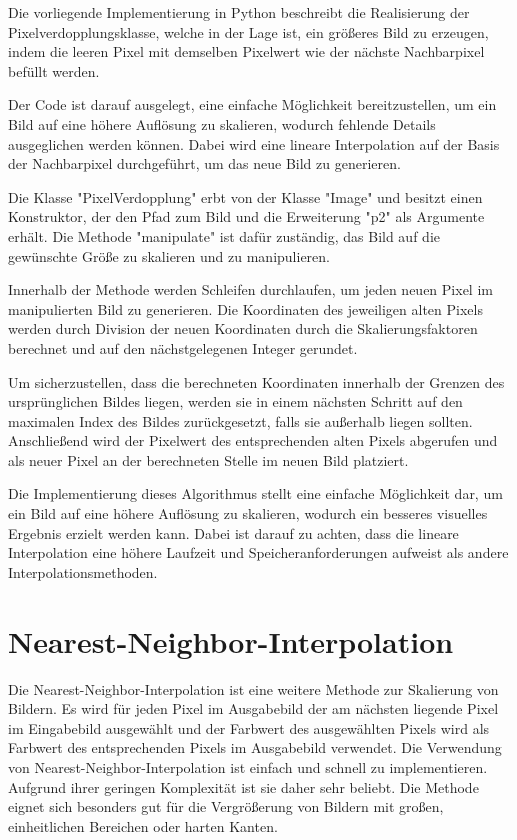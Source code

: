 Die vorliegende Implementierung in Python beschreibt die Realisierung der Pixelverdopplungsklasse, welche in der Lage ist, ein größeres Bild zu erzeugen, indem die leeren Pixel mit demselben Pixelwert wie der nächste Nachbarpixel befüllt werden.

Der Code ist darauf ausgelegt, eine einfache Möglichkeit bereitzustellen, um ein Bild auf eine höhere Auflösung zu skalieren, wodurch fehlende Details ausgeglichen werden können. Dabei wird eine lineare Interpolation auf der Basis der Nachbarpixel durchgeführt, um das neue Bild zu generieren.

Die Klasse "PixelVerdopplung" erbt von der Klasse "Image" und besitzt einen Konstruktor, der den Pfad zum Bild und die Erweiterung "p2" als Argumente erhält. Die Methode "manipulate" ist dafür zuständig, das Bild auf die gewünschte Größe zu skalieren und zu manipulieren.

Innerhalb der Methode werden Schleifen durchlaufen, um jeden neuen Pixel im manipulierten Bild zu generieren. Die Koordinaten des jeweiligen alten Pixels werden durch Division der neuen Koordinaten durch die Skalierungsfaktoren berechnet und auf den nächstgelegenen Integer gerundet.

Um sicherzustellen, dass die berechneten Koordinaten innerhalb der Grenzen des ursprünglichen Bildes liegen, werden sie in einem nächsten Schritt auf den maximalen Index des Bildes zurückgesetzt, falls sie außerhalb liegen sollten. Anschließend wird der Pixelwert des entsprechenden alten Pixels abgerufen und als neuer Pixel an der berechneten Stelle im neuen Bild platziert.

Die Implementierung dieses Algorithmus stellt eine einfache Möglichkeit dar, um ein Bild auf eine höhere Auflösung zu skalieren, wodurch ein besseres visuelles Ergebnis erzielt werden kann. Dabei ist darauf zu achten, dass die lineare Interpolation eine höhere Laufzeit und Speicheranforderungen aufweist als andere Interpolationsmethoden.



\section{Nearest-Neighbor-Interpolation}
Die Nearest-Neighbor-Interpolation ist eine weitere Methode zur Skalierung von Bildern. 
Es wird für jeden Pixel im Ausgabebild der am nächsten liegende Pixel im Eingabebild ausgewählt und der Farbwert des ausgewählten Pixels wird als Farbwert des entsprechenden Pixels im Ausgabebild verwendet.
Die Verwendung von Nearest-Neighbor-Interpolation ist einfach und schnell zu implementieren. 
Aufgrund ihrer geringen Komplexität ist sie daher sehr beliebt. 
Die Methode eignet sich besonders gut für die Vergrößerung von Bildern mit großen, einheitlichen Bereichen oder harten Kanten. 


